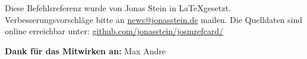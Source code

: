 \documentclass[a4paper,11pt,notumble]{leaflet}
\begin{document}
\newpage
Diese Befehlsreferenz wurde von Jonas Stein in \LaTeX gesetzt.
Verbesserungsvorschläge bitte an \href{mailto:news@jonasstein.de}{news@jonasstein.de} mailen.
Die Quelldaten sind online erreichbar unter: 
\href{http://github.com/jonasstein/josmrefcard/}{github.com/jonasstein/josmrefcard/}

\textbf{Dank für das Mitwirken an:} Max Andre
\end{document}
